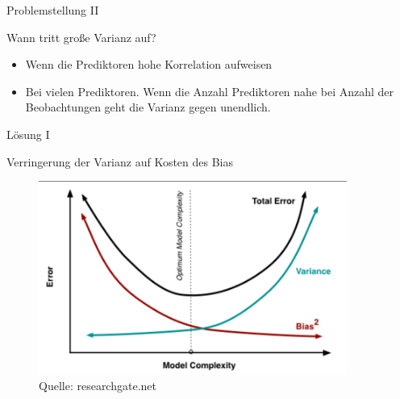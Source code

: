 \documentclass[10pt]{beamer}
\begin{document}
\begin{frame}{Problemstellung II}
        
        \begin{Large}{Wann tritt große Varianz auf?}\end{Large}
        
        \begin{itemize}
            \item Wenn die Prediktoren hohe Korrelation aufweisen
            \item Bei vielen Prediktoren. Wenn die Anzahl Prediktoren nahe bei Anzahl der Beobachtungen geht die Varianz gegen unendlich.
        \end{itemize}
    
\end{frame}

\begin{frame}{Lösung I}

    \begin{Large}{Verringerung der Varianz auf Kosten des Bias}\end{Large}

        \begin{figure}
            \centering
            \includegraphics[width=0.9\textwidth]{figures/complexity_error.png}
            \caption{Quelle: researchgate.net}
        \end{figure}
        
\end{frame}
\end{document}
